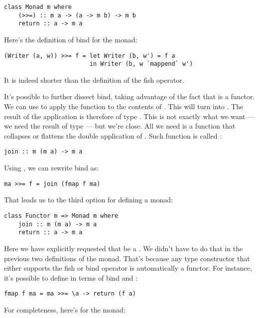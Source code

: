 \begin{Verbatim}[commandchars=\\\{\}]
class Monad m where
    (>>=) :: m a -> (a -> m b) -> m b
    return :: a -> m a
\end{Verbatim}
Here's the definition of bind for the  monad:

\begin{Verbatim}[commandchars=\\\{\}]
(Writer (a, w)) >>= f = let Writer (b, w') = f a 
                        in Writer (b, w `mappend` w')
\end{Verbatim}
It is indeed shorter than the definition of the fish operator.

It's possible to further dissect bind, taking advantage of the fact that
 is a functor. We can use  to apply the function
 to the contents of . This
will turn  into . The result of the application
is therefore of type . This is not exactly what we
want --- we need the result of type  --- but we're close.
All we need is a function that collapses or flattens the double
application of . Such function is called :

\begin{Verbatim}[commandchars=\\\{\}]
join :: m (m a) -> m a
\end{Verbatim}
Using , we can rewrite bind as:

\begin{Verbatim}[commandchars=\\\{\}]
ma >>= f = join (fmap f ma)
\end{Verbatim}
That leads us to the third option for defining a monad:

\begin{Verbatim}[commandchars=\\\{\}]
class Functor m => Monad m where
    join :: m (m a) -> m a
    return :: a -> m a
\end{Verbatim}
Here we have explicitly requested that  be a .
We didn't have to do that in the previous two definitions of the monad.
That's because any type constructor  that either supports the
fish or bind operator is automatically a functor. For instance, it's
possible to define  in terms of bind and :

\begin{Verbatim}
fmap f ma = ma >>= \a -> return (f a)
\end{Verbatim}
For completeness, here's  for the  monad:

